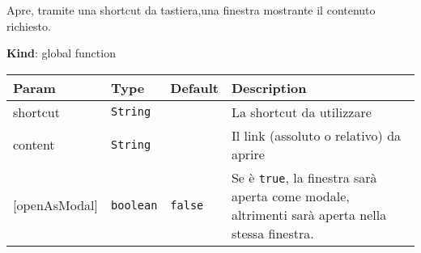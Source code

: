 Apre, tramite una shortcut da tastiera,una finestra mostrante il
contenuto richiesto.

\textbf{Kind}: global function

\begin{tabularx}{\textwidth}{XXXX}
\toprule
\begin{minipage}[b]{0.22\columnwidth}\raggedright
Param\strut
\end{minipage} & \begin{minipage}[b]{0.22\columnwidth}\raggedright
Type\strut
\end{minipage} & \begin{minipage}[b]{0.22\columnwidth}\raggedright
Default\strut
\end{minipage} & \begin{minipage}[b]{0.22\columnwidth}\raggedright
Description\strut
\end{minipage}\tabularnewline
\midrule
\endhead
\begin{minipage}[t]{0.22\columnwidth}\raggedright
shortcut\strut
\end{minipage} & \begin{minipage}[t]{0.22\columnwidth}\raggedright
\texttt{String}\strut
\end{minipage} & \begin{minipage}[t]{0.22\columnwidth}\raggedright
\strut
\end{minipage} & \begin{minipage}[t]{0.22\columnwidth}\raggedright
La shortcut da utilizzare\strut
\end{minipage}\tabularnewline
\begin{minipage}[t]{0.22\columnwidth}\raggedright
content\strut
\end{minipage} & \begin{minipage}[t]{0.22\columnwidth}\raggedright
\texttt{String}\strut
\end{minipage} & \begin{minipage}[t]{0.22\columnwidth}\raggedright
\strut
\end{minipage} & \begin{minipage}[t]{0.22\columnwidth}\raggedright
Il link (assoluto o relativo) da aprire\strut
\end{minipage}\tabularnewline
\begin{minipage}[t]{0.22\columnwidth}\raggedright
{[}openAsModal{]}\strut
\end{minipage} & \begin{minipage}[t]{0.22\columnwidth}\raggedright
\texttt{boolean}\strut
\end{minipage} & \begin{minipage}[t]{0.22\columnwidth}\raggedright
\texttt{false}\strut
\end{minipage} & \begin{minipage}[t]{0.22\columnwidth}\raggedright
Se è \texttt{true}, la finestra sarà aperta come modale, altrimenti sarà
aperta nella stessa finestra.\strut
\end{minipage}\tabularnewline
\bottomrule
\end{tabularx}


